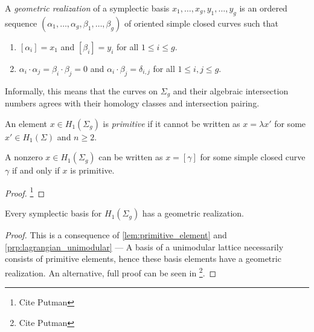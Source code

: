 \begin{definition}
	A \textit{geometric realization} of a symplectic basis $x_1,\dots,x_g,y_1,\dots,y_g$ is an ordered sequence $(\alpha_1,\dots,\alpha_g,\beta_1,\dots,\beta_g)$ of oriented simple closed curves such that
	\begin{enumerate}
		\item $[\alpha_i] = x_1$ and $[\beta_i] = y_i$ for all $1 \leq i \leq g$.
		\item $\alpha_i \cdot \alpha_j = \beta_i \cdot \beta_j = 0$ and $\alpha_i \cdot \beta_j = \delta_{i,j}$ for all $1 \leq i,j \leq g$.
	\end{enumerate}
	Informally, this means that the curves on $\Sigma_g$ and their algebraic intersection numbers agrees with their homology classes and intersection pairing.
\end{definition}

\begin{definition}
	An element $x \in H_1(\Sigma_g)$ is \textit{primitive} if it cannot be written as $x = \lambda x'$ for some $x' \in H_1(\Sigma)$ and $n \geq 2$. 
\end{definition}

\begin{lemma}
	\label{lem:primitive_element}
	A nonzero $x \in H_1(\Sigma_g)$ can be written as $x = [\gamma]$ for some simple closed curve $\gamma$ if and only if $x$ is primitive.
\end{lemma}
\begin{proof}
	\footnote{Cite Putman}
\end{proof}

\begin{theorem}
	Every symplectic basis for $H_1(\Sigma_g)$ has a geometric realization.
\end{theorem}
\begin{proof}
	This is a consequence of \autoref{lem:primitive_element} and \autoref{prp:lagrangian_unimodular} --- A basis of a unimodular lattice necessarily consists of primitive elements, hence these basis elements have a geometric realization. An alternative, full proof can be seen in \footnote{Cite Putman}.
\end{proof}
